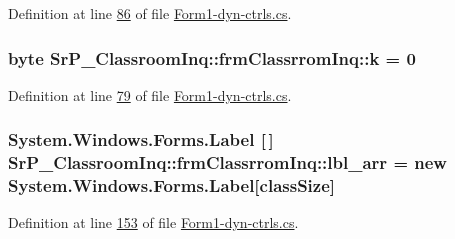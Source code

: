 \-Definition at line \hyperlink{_form1-dyn-ctrls_8cs_source_l00086}{86} of file \hyperlink{_form1-dyn-ctrls_8cs_source}{\-Form1-\/dyn-\/ctrls.\-cs}.

\hypertarget{class_sr_p___classroom_inq_1_1frm_classrrom_inq_ad13cb123edd99d95b379613aad0f2a39}{
\subsubsection[{k}]{\setlength{\rightskip}{0pt plus 5cm}byte {\bf \-Sr\-P\-\_\-\-Classroom\-Inq\-::frm\-Classrrom\-Inq\-::k} = 0}}
\label{class_sr_p___classroom_inq_1_1frm_classrrom_inq_ad13cb123edd99d95b379613aad0f2a39}


\-Definition at line \hyperlink{_form1-dyn-ctrls_8cs_source_l00079}{79} of file \hyperlink{_form1-dyn-ctrls_8cs_source}{\-Form1-\/dyn-\/ctrls.\-cs}.

\hypertarget{class_sr_p___classroom_inq_1_1frm_classrrom_inq_a7f0a5f5fff7a87e841b2793f89dcd997}{
\subsubsection[{lbl\-\_\-arr}]{\setlength{\rightskip}{0pt plus 5cm}\-System.\-Windows.\-Forms.\-Label \mbox{[}$\,$\mbox{]} {\bf \-Sr\-P\-\_\-\-Classroom\-Inq\-::frm\-Classrrom\-Inq\-::lbl\-\_\-arr} = new \-System.\-Windows.\-Forms.\-Label\mbox{[}{\bf class\-Size}\mbox{]}}}
\label{class_sr_p___classroom_inq_1_1frm_classrrom_inq_a7f0a5f5fff7a87e841b2793f89dcd997}


\-Definition at line \hyperlink{_form1-dyn-ctrls_8cs_source_l00153}{153} of file \hyperlink{_form1-dyn-ctrls_8cs_source}{\-Form1-\/dyn-\/ctrls.\-cs}.


